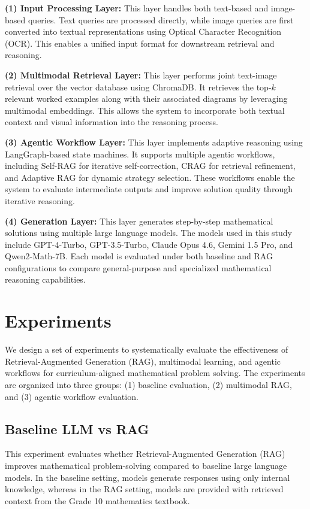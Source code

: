 \documentclass[11pt]{article}
\begin{document}
\textbf{(1) Input Processing Layer:}  
This layer handles both text-based and image-based queries. Text queries are processed directly, while image queries are first converted into textual representations using Optical Character Recognition (OCR). This enables a unified input format for downstream retrieval and reasoning.

\textbf{(2) Multimodal Retrieval Layer:}  
This layer performs joint text-image retrieval over the vector database using ChromaDB. It retrieves the top-$k$ relevant worked examples along with their associated diagrams by leveraging multimodal embeddings. This allows the system to incorporate both textual context and visual information into the reasoning process.

\textbf{(3) Agentic Workflow Layer:}  
This layer implements adaptive reasoning using LangGraph-based state machines. It supports multiple agentic workflows, including Self-RAG for iterative self-correction, CRAG for retrieval refinement, and Adaptive RAG for dynamic strategy selection. These workflows enable the system to evaluate intermediate outputs and improve solution quality through iterative reasoning.

\textbf{(4) Generation Layer:}  
This layer generates step-by-step mathematical solutions using multiple large language models. The models used in this study include GPT-4-Turbo, GPT-3.5-Turbo, Claude Opus 4.6, Gemini 1.5 Pro, and Qwen2-Math-7B. Each model is evaluated under both baseline and RAG configurations to compare general-purpose and specialized mathematical reasoning capabilities.

\section{Experiments}

We design a set of experiments to systematically evaluate the effectiveness of Retrieval-Augmented Generation (RAG), multimodal learning, and agentic workflows for curriculum-aligned mathematical problem solving. The experiments are organized into three groups: (1) baseline evaluation, (2) multimodal RAG, and (3) agentic workflow evaluation.

\subsection{Baseline LLM vs RAG}

This experiment evaluates whether Retrieval-Augmented Generation (RAG) improves mathematical problem-solving compared to baseline large language models. In the baseline setting, models generate responses using only internal knowledge, whereas in the RAG setting, models are provided with retrieved context from the Grade 10 mathematics textbook.
\end{document}
